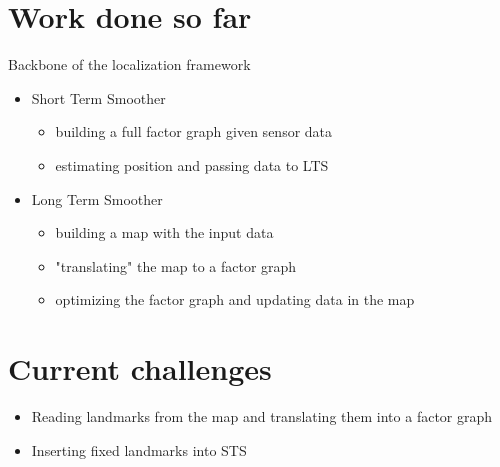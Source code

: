 \documentclass[%
    fourtothree=true, %
    DepLogo=true     %
    ]{ETHpres}
\begin{document}

%

\clearpage

\ETHslide
\section*{Work done so far}
Backbone of the localization framework
\begin{itemize}
	\item[\ETHitem] Short Term Smoother 
		\begin{itemize}
			\item building a full factor graph given sensor data
			\item estimating position and passing data to LTS
		\end{itemize}
	\item[\ETHitem] Long Term Smoother
		\begin{itemize}
		 	\item building a map with the input data	
		 	\item "translating" the map to a factor graph
		 	\item optimizing the factor graph and updating data in the map
		\end{itemize}
\end{itemize}

\clearpage

\ETHslide
\section*{Current challenges}
\begin{itemize}
	\item[\ETHitem] Reading landmarks from the map and translating them into a factor graph
	\item[\ETHitem] Inserting fixed landmarks into STS
\end{itemize}
\clearpage

\ETHslide
\end{document}
